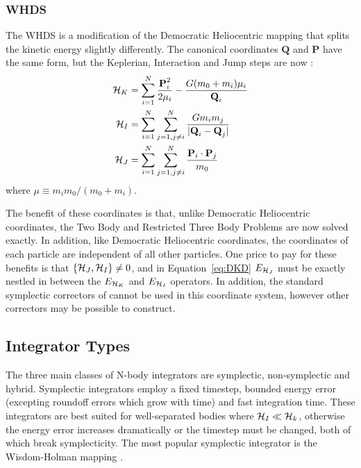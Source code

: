 \subsubsection{WHDS}
The WHDS is a modification of the Democratic Heliocentric mapping that splits the kinetic energy slightly differently. 
The canonical coordinates $\textbf{Q}$ and $\textbf{P}$ have the same form, but the Keplerian, Interaction and Jump steps are now \citep{Laskar1995, Wisdom2006, Hernandez2016}:
\begin{align}
\begin{split}
\mathcal{H}_K &= \sum_{i=1}^N \frac{\textbf{P}_i^2}{2\mu_i} - \frac{G(m_0 + m_i)\mu_i}{\textbf{Q}_i} \\
\mathcal{H}_I &= \sum_{i=1}^{N}\sum_{j=1,j \ne i}^N \frac{Gm_im_j}{|\textbf{Q}_i - \textbf{Q}_j|} \\
\mathcal{H}_J &= \sum_{i=1}^{N}\sum_{j=1,j \ne i}^N \frac{\textbf{P}_i \cdot \textbf{P}_j}{m_0}
\end{split}
\end{align}
where $\mu \equiv m_im_0/(m_0 + m_i)$.

The benefit of these coordinates is that, unlike Democratic Heliocentric coordinates, the Two Body and Restricted Three Body Problems are now solved exactly. 
In addition, like Democratic Heliocentric coordinates, the coordinates of each particle are independent of all other particles. 
One price to pay for these benefits is that $\{\mathcal{H}_J, \mathcal{H}_I\} \ne 0$, and in Equation~\ref{eq:DKD} $E_{\mathcal{H}_J}$ must be exactly nestled in between the $E_{\mathcal{H}_K}$ and $E_{\mathcal{H}_I}$ operators.
In addition, the standard symplectic correctors of \citet{Wisdom2006} cannot be used in this coordinate system, however other correctors may be possible to construct. 

\subsection{Integrator Types}
\label{sec:inttypes}
The three main classes of N-body integrators are symplectic, non-symplectic and hybrid. 
Symplectic integrators employ a fixed timestep, bounded energy error (excepting roundoff errors which grow with time) and fast integration time.
These integrators are best suited for well-separated bodies where $\mathcal{H}_I \ll \mathcal{H}_k$, otherwise the energy error increases dramatically or the timestep must be changed, both of which break symplecticity. 
The most popular symplectic integrator is the Wisdom-Holman mapping \citep{Wisdom1991}.

